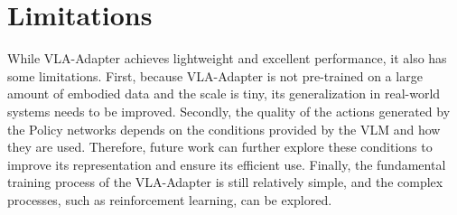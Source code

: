 \section{Limitations}\label{sec6}

While VLA-Adapter achieves lightweight and excellent performance, it also has some limitations. First, because VLA-Adapter is not pre-trained on a large amount of embodied data and the scale is tiny, its generalization in real-world systems needs to be improved. Secondly, the quality of the actions generated by the Policy networks depends on the conditions provided by the VLM and how they are used. Therefore, future work can further explore these conditions to improve its representation and ensure its efficient use. Finally, the fundamental training process of the VLA-Adapter is still relatively simple, and the complex processes, such as reinforcement learning, can be explored.